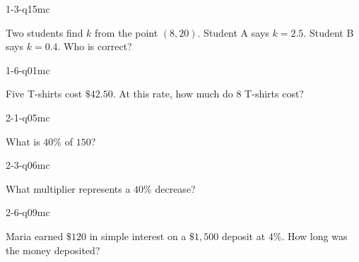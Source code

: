 
\begin{practiceQuestion}{1-3-q15}{mc}
\begin{questionText}
Two students find $k$ from the point $(8, 20)$. Student A says $k = 2.5$. Student B says $k = 0.4$. Who is correct?
\end{questionText}
\end{practiceQuestion}

\begin{practiceQuestion}{1-6-q01}{mc}
\begin{questionText}
Five T-shirts cost $\$42.50$. At this rate, how much do $8$ T-shirts cost?
\end{questionText}
\end{practiceQuestion}

\begin{practiceQuestion}{2-1-q05}{mc}
\begin{questionText}
What is $40\%$ of $150$?
\end{questionText}
\end{practiceQuestion}

\begin{practiceQuestion}{2-3-q06}{mc}
\begin{questionText}
What multiplier represents a $40\%$ decrease?
\end{questionText}
\end{practiceQuestion}

\begin{practiceQuestion}{2-6-q09}{mc}
\begin{questionText}
Maria earned $\$120$ in simple interest on a $\$1{,}500$ deposit at $4\%$. How long was the money deposited?
\end{questionText}
\end{practiceQuestion}

